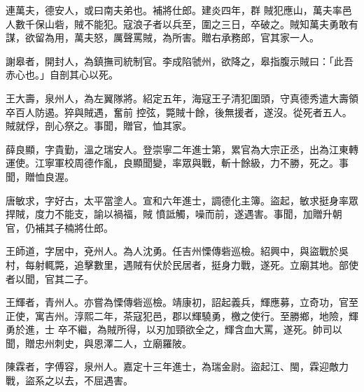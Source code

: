 \begin{pinyinscope}
 連萬夫，德安人，或曰南夫弟也。補將仕郎。建炎四年，群
 賊犯應山，萬夫率邑人數千保山砦，賊不能犯。寇浪子者以兵至，圍之三日，卒破之。賊知萬夫勇敢有謀，欲留為用，萬夫怒，厲聲罵賊，為所害。贈右承務郎，官其家一人。



 謝皋者，開封人，為鎮撫司統制官。李成陷虢州，欲降之，皋指腹示賊曰：「此吾赤心也。」自剖其心以死。



 王大壽，泉州人，為左翼隊將。紹定五年，海寇王子清犯圍頭，守真德秀遣大壽領卒百人防遏。猝與賊遇，奮前
 控弦，斃賊十餘，後無援者，遂沒。從死者五人。賊就俘，剖心祭之。事聞，贈官，恤其家。



 薛良顯，字貴勤，溫之瑞安人。登崇寧二年進士第，累官為大宗正丞，出為江東轉運使。江寧軍校周德作亂，良顯聞變，率眾與戰，斬十餘級，力不勝，死之。事聞，贈恤良渥。



 唐敏求，字好古，太平當塗人。宣和六年進士，調德化主簿。盜起，敏求挺身率眾捍賊，度力不能支，諭以禍福，賊
 憤詆觸，噪而前，遂遇害。事聞，加贈升朝官，仍補其子楠將仕郎。



 王師道，字居中，兗州人。為人沈勇。任吉州慄傳砦巡檢。紹興中，與盜戰於吳村，每射輒斃，追擊數里，遇賊有伏於民居者，挺身力戰，遂死。立廟其地。部使者以聞，官其二子。



 王輝者，青州人。亦嘗為慄傳砦巡檢。靖康初，詔起義兵，輝應募，立奇功，官至正使，寓吉州。淳熙二年，茶寇犯邑，郡以輝驍勇，檄之使行。至勝鄉，地險，輝勇於進，士
 卒不繼，為賊所得，以刃加頸欲全之，輝含血大罵，遂死。帥司以聞，贈忠州刺史，與恩澤二人，立廟羅陂。



 陳霖者，字傅容，泉州人。嘉定十三年進士，為瑞金尉。盜起江、閩，霖迎敵力戰，盜系之以去，不屈遇害。



\end{pinyinscope}